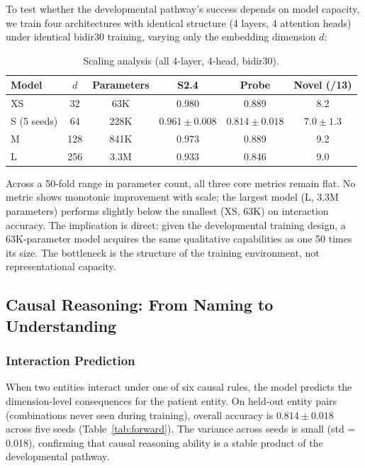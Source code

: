 \documentclass{article}
\begin{document}
To test whether the developmental pathway's success depends on model capacity, we train four architectures with identical structure (4 layers, 4 attention heads) under identical bidir30 training, varying only the embedding dimension $d$:

\begin{table}[htbp]
\centering
\small
\begin{tabular}{lccccc}
\toprule
Model & $d$ & Parameters & S2.4 & Probe & Novel (/13) \\
\midrule
XS & 32 & 63K & 0.980 & 0.889 & 8.2 \\
S (5 seeds) & 64 & 228K & $0.961 \pm 0.008$ & $0.814 \pm 0.018$ & $7.0 \pm 1.3$ \\
M & 128 & 841K & 0.973 & 0.889 & 9.2 \\
L & 256 & 3.3M & 0.933 & 0.846 & 9.0 \\
\bottomrule
\end{tabular}
\caption{Scaling analysis (all 4-layer, 4-head, bidir30).}
\label{tab:scaling}
\end{table}

Across a 50-fold range in parameter count, all three core metrics remain flat. No metric shows monotonic improvement with scale; the largest model (L, 3.3M parameters) performs slightly below the smallest (XS, 63K) on interaction accuracy. The implication is direct: given the developmental training design, a 63K-parameter model acquires the same qualitative capabilities as one 50 times its size. The bottleneck is the structure of the training environment, not representational capacity.

\subsection{Causal Reasoning: From Naming to Understanding}

\subsubsection{Interaction Prediction}

When two entities interact under one of six causal rules, the model predicts the dimension-level consequences for the patient entity. On held-out entity pairs (combinations never seen during training), overall accuracy is $0.814 \pm 0.018$ across five seeds (Table~\ref{tab:forward}). The variance across seeds is small (std = 0.018), confirming that causal reasoning ability is a stable product of the developmental pathway.
\end{document}
